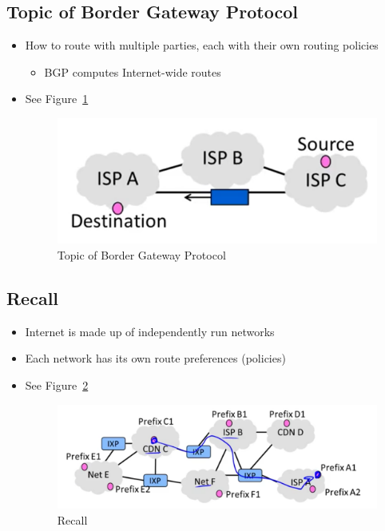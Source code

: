 \documentclass[12pt]{ctexart}   %
\begin{document}
	\subsection{ Topic of Border Gateway Protocol  }
	\begin{itemize}
		\item How to route with multiple parties, each with their own routing policies
		\begin{itemize}
			\item BGP computes Internet-wide routes
		\end{itemize}
		\item See Figure~\ref{fig:5-12-1}
			
		\begin{figure}[h!] %
		\centering
		 \includegraphics[scale=0.7]{images/5-12-1}
		\caption{ Topic of Border Gateway Protocol }
		 \label{fig:5-12-1}
		 \end{figure}
	\end{itemize}
	
	\subsection{Recall}
	\begin{itemize}
		\item Internet is made up of independently run networks
		\item Each network has its own route preferences (policies)
		\item See Figure~\ref{fig:5-12-2}
			
		\begin{figure}[h!] %
		\centering
		 \includegraphics[scale=0.7]{images/5-12-2}
		\caption{ Recall }
		 \label{fig:5-12-2}
		 \end{figure}
	\end{itemize}
	
\end{document}
